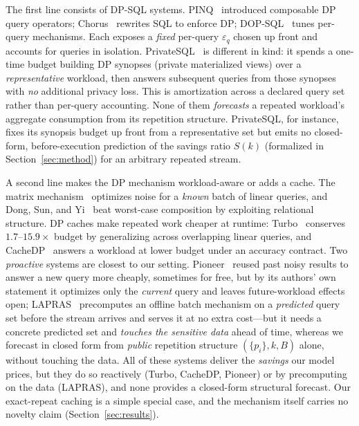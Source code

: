 \documentclass[sigconf,nonacm]{acmart}
\newcommand{\eps}{\varepsilon}
\begin{document}
The first line consists of DP-SQL systems. PINQ~\cite{mcsherry2009privacy} introduced composable DP query operators; Chorus~\cite{johnson2020chorus} rewrites SQL to enforce DP; DOP-SQL~\cite{yu2024dopsql} tunes per-query mechanisms. Each exposes a \emph{fixed} per-query $\eps_q$ chosen up front and accounts for queries in isolation. PrivateSQL~\cite{kotsogiannis2019privatesql} is different in kind: it spends a one-time budget building DP synopses (private materialized views) over a \emph{representative} workload, then answers subsequent queries from those synopses with \emph{no} additional privacy loss. This is amortization across a declared query set rather than per-query accounting. None of them \emph{forecasts} a repeated workload's aggregate consumption from its repetition structure. PrivateSQL, for instance, fixes its synopsis budget up front from a representative set but emits no closed-form, before-execution prediction of the savings ratio $S(k)$ (formalized in Section~\ref{sec:method}) for an arbitrary repeated stream.

A second line makes the DP mechanism workload-aware or adds a cache. The matrix mechanism~\cite{li2015matrix} optimizes noise for a \emph{known} batch of linear queries, and Dong, Sun, and Yi~\cite{dong2023better} beat worst-case composition by exploiting relational structure. DP caches make repeated work cheaper at runtime: Turbo~\cite{kostopoulou2023turbo} conserves $1.7$--$15.9\times$ budget by generalizing across overlapping linear queries, and CacheDP~\cite{mazmudar2023cachedp} answers a workload at lower budget under an accuracy contract. Two \emph{proactive} systems are closest to our setting. Pioneer~\cite{peng2013pioneer} reused past noisy results to answer a new query more cheaply, sometimes for free, but by its authors' own statement it optimizes only the \emph{current} query and leaves future-workload effects open; LAPRAS~\cite{mundra2026lapras} precomputes an offline batch mechanism on a \emph{predicted} query set before the stream arrives and serves it at no extra cost---but it needs a concrete predicted set and \emph{touches the sensitive data} ahead of time, whereas we forecast in closed form from \emph{public} repetition structure $(\{p_i\},k,B)$ alone, without touching the data. All of these systems deliver the \emph{savings} our model prices, but they do so reactively (Turbo, CacheDP, Pioneer) or by precomputing on the data (LAPRAS), and none provides a closed-form structural forecast. Our exact-repeat caching is a simple special case, and the mechanism itself carries no novelty claim (Section~\ref{sec:results}).
\end{document}
